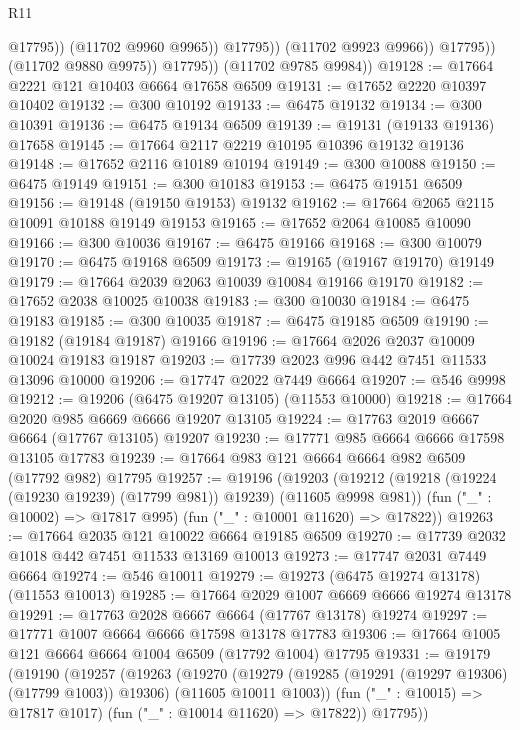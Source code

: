 \begin{lexlean}{R11}
\begin{coremodule}
                            @17795))
                        (@11702 @9960 @9965))
                      @17795))
                  (@11702 @9923 @9966))
                @17795))
            (@11702 @9880 @9975))
          @17795))
      (@11702 @9785 @9984))
@19128 := @17664 @2221 @121 @10403 @6664 @17658 @6509
@19131 := @17652 @2220 @10397 @10402
@19132 := @300 @10192
@19133 := @6475 @19132
@19134 := @300 @10391
@19136 := @6475 @19134 @6509
@19139 := @19131 (@19133 @19136) @17658
@19145 := @17664 @2117 @2219 @10195 @10396 @19132 @19136
@19148 := @17652 @2116 @10189 @10194
@19149 := @300 @10088
@19150 := @6475 @19149
@19151 := @300 @10183
@19153 := @6475 @19151 @6509
@19156 := @19148 (@19150 @19153) @19132
@19162 := @17664 @2065 @2115 @10091 @10188 @19149 @19153
@19165 := @17652 @2064 @10085 @10090
@19166 := @300 @10036
@19167 := @6475 @19166
@19168 := @300 @10079
@19170 := @6475 @19168 @6509
@19173 := @19165 (@19167 @19170) @19149
@19179 := @17664 @2039 @2063 @10039 @10084 @19166 @19170
@19182 := @17652 @2038 @10025 @10038
@19183 := @300 @10030
@19184 := @6475 @19183
@19185 := @300 @10035
@19187 := @6475 @19185 @6509
@19190 := @19182 (@19184 @19187) @19166
@19196 := @17664 @2026 @2037 @10009 @10024 @19183 @19187
@19203 := @17739 @2023 @996 @442 @7451 @11533 @13096 @10000
@19206 := @17747 @2022 @7449 @6664
@19207 := @546 @9998
@19212 := @19206 (@6475 @19207 @13105) (@11553 @10000)
@19218 := @17664 @2020 @985 @6669 @6666 @19207 @13105
@19224 := @17763 @2019 @6667 @6664 (@17767 @13105) @19207
@19230 := @17771 @985 @6664 @6666 @17598 @13105 @17783
@19239 := @17664 @983 @121 @6664 @6664 @982 @6509 (@17792 @982) @17795
@19257 := @19196
    (@19203
      (@19212 (@19218 (@19224 (@19230 @19239) (@17799 @981)) @19239) (@11605 @9998 @981))
      (fun ("_" : @10002) => @17817 @995)
      (fun ("_" : @10001 @11620) => @17822))
@19263 := @17664 @2035 @121 @10022 @6664 @19185 @6509
@19270 := @17739 @2032 @1018 @442 @7451 @11533 @13169 @10013
@19273 := @17747 @2031 @7449 @6664
@19274 := @546 @10011
@19279 := @19273 (@6475 @19274 @13178) (@11553 @10013)
@19285 := @17664 @2029 @1007 @6669 @6666 @19274 @13178
@19291 := @17763 @2028 @6667 @6664 (@17767 @13178) @19274
@19297 := @17771 @1007 @6664 @6666 @17598 @13178 @17783
@19306 := @17664 @1005 @121 @6664 @6664 @1004 @6509 (@17792 @1004) @17795
@19331 := @19179
    (@19190
      (@19257
        (@19263
          (@19270
            (@19279 (@19285 (@19291 (@19297 @19306) (@17799 @1003)) @19306) (@11605 @10011 @1003))
            (fun ("_" : @10015) => @17817 @1017)
            (fun ("_" : @10014 @11620) => @17822))
          @17795))

\end{coremodule}
\end{lexlean}
